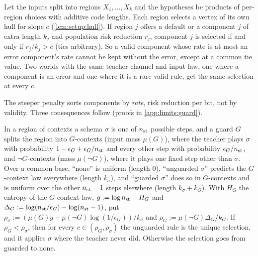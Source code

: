 \begin{proposition}\label{prop:limits:separable}
Let the inputs split into regions $X_1,\dots,X_k$ and the hypotheses be products of per-region choices with additive code lengths. Each region selects a vertex of its own hull for slope $c$ (\cref{lem:setup:hull}). If region $j$ offers a default or a component $j$ of extra length $k_j$ and population risk reduction $r_j$, component $j$ is selected if and only if $r_j/k_j>c$ (ties arbitrary). So a valid component whose rate is at most an error component's rate cannot be kept without the error, except at a common tie value. Two worlds with the same teacher channel and input law, one where a component is an error and one where it is a rare valid rule, get the same selection at every $c$.
\end{proposition}

The steeper penalty sorts components by \emph{rate}, risk reduction per bit, not by validity. Three consequences follow (proofs in \cref{app:limits:guard}).

\begin{proposition}\label{prop:limits:guard}
In a region of contexts a schema $\sigma$ is one of $n_{\rm st}$ possible steps, and a guard $G$ splits the region into $G$-contexts (input mass $\mu(G)$), where the teacher plays $\sigma$ with probability $1-\epsilon_G+\epsilon_G/n_{\rm st}$ and every other step with probability $\epsilon_G/n_{\rm st}$, and $\neg G$-contexts (mass $\mu(\neg G)$), where it plays one fixed step other than $\sigma$. Over a common base, ``none'' is uniform (length $0$), ``unguarded $\sigma$'' predicts the $G$-context law everywhere (length $k_\sigma$), and ``guarded $\sigma$'' does so in $G$-contexts and is uniform over the other $n_{\rm st}-1$ steps elsewhere (length $k_\sigma+k_G$). With $H_G$ the entropy of the $G$-context law, $g:=\log n_{\rm st}-H_G$ and $\Delta_G:=\log(n_{\rm st}/\epsilon_G)-\log(n_{\rm st}-1)$, put $\rho_\sigma:=(\mu(G)g-\mu(\neg G)\log(1/\epsilon_G))/k_\sigma$ and $\rho_G:=\mu(\neg G)\Delta_G/k_G$. If $\rho_G<\rho_\sigma$, then for every $c\in(\rho_G,\rho_\sigma)$ the unguarded rule is the unique selection, and it applies $\sigma$ where the teacher never did. Otherwise the selection goes from guarded to none.
\end{proposition}

